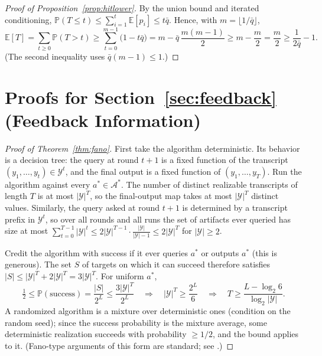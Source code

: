 \documentclass{article}
\theoremstyle{plain}
\theoremstyle{definition}
\theoremstyle{remark}
\newcommand{\A}{\mathcal{A}}
\newcommand{\Y}{\mathcal{Y}}
\newcommand{\E}{\mathbb{E}}
\renewcommand{\P}{\mathbb{P}}
\begin{document}
\begin{proof}[Proof of Proposition~\ref{prop:hitlower}]
By the union bound and iterated conditioning, $\P(T \le t) \le \sum_{i=1}^{t} \E[p_i] \le t \bar{q}$. Hence, with $m = \lfloor 1/\bar{q} \rfloor$,
\[
\E[T] = \sum_{t \ge 0} \P(T > t) \ge \sum_{t=0}^{m-1} \big(1 - t\bar{q}\big)
= m - \bar{q}\,\frac{m(m-1)}{2} \ge m - \frac{m}{2} = \frac{m}{2} \ge \frac{1}{2\bar{q}} - 1 .
\]
(The second inequality uses $\bar q (m-1) \le 1$.)
\end{proof}

\section{Proofs for Section~\ref{sec:feedback} (Feedback Information)}
\label{app:feedback}

\begin{proof}[Proof of Theorem~\ref{thm:fano}]
First take the algorithm deterministic. Its behavior is a decision tree: the query at round $t+1$ is a fixed function of the transcript $(y_1, \dots, y_t) \in \Y^t$, and the final output is a fixed function of $(y_1, \dots, y_T)$. Run the algorithm against every $a^* \in \A^*$. The number of distinct realizable transcripts of length $T$ is at most $|\Y|^T$, so the final-output map takes at most $|\Y|^T$ distinct values. Similarly, the query asked at round $t+1$ is determined by a transcript prefix in $\Y^{t}$, so over all rounds and all runs the set of artifacts ever queried has size at most $\sum_{t=0}^{T-1} |\Y|^{t} \le 2|\Y|^{T-1}\cdot\frac{|\Y|}{|\Y|-1} \le 2 |\Y|^T$ for $|\Y| \ge 2$.

Credit the algorithm with success if it ever queries $a^*$ or outputs $a^*$ (this is generous). The set $S$ of targets on which it can succeed therefore satisfies $|S| \le |\Y|^T + 2|\Y|^T = 3|\Y|^T$. For uniform $a^*$,
\[
\tfrac{1}{2} \le \P(\text{success}) = \frac{|S|}{2^L} \le \frac{3 |\Y|^T}{2^L}
\quad\Longrightarrow\quad
|\Y|^T \ge \frac{2^L}{6}
\quad\Longrightarrow\quad
T \ge \frac{L - \log_2 6}{\log_2 |\Y|} .
\]
A randomized algorithm is a mixture over deterministic ones (condition on the random seed); since the success probability is the mixture average, some deterministic realization succeeds with probability $\ge 1/2$, and the bound applies to it. (Fano-type arguments of this form are standard; see \citealp{cover2006elements}.)
\end{proof}
\end{document}
